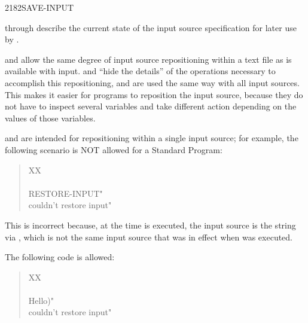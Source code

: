 \begin{worddef}{2182}{SAVE-INPUT}
\item {}

	 through  describe the current state of the
	input source specification for later use by .


	\begin{rationale} %
		 and  allow the same
		degree of input source repositioning within a text file as is
		available with  input. 
		and  ``hide the details'' of the operations
		necessary to accomplish this repositioning, and are used the
		same way with all input sources. This makes it easier for
		programs to reposition the input source, because they do not
		have to inspect several variables and take different action
		depending on the values of those variables.

		 and  are intended for
		repositioning within a single input source; for example, the
		following scenario is NOT allowed for a Standard Program:

		\begin{quote}\ttfamily
			\word{:} XX \\
			\tab {} ~  \\
			\tab {} RESTORE-INPUT"  \\
			\tab {} couldn't restore input" \\
			\word{;}
		\end{quote}

		This is incorrect because, at the time  is
		executed, the input source is the string via ,
		which is not the same input source that was in effect when
		 was executed.

		The following code is allowed:

		\begin{quote}\ttfamily
			\word{:} XX \\
			\tab {} ~  \\
			\tab {}  Hello)"  \\
			\tab {}  couldn't restore input" \\
			\word{;}
		\end{quote}


\end{rationale}
\end{worddef}
